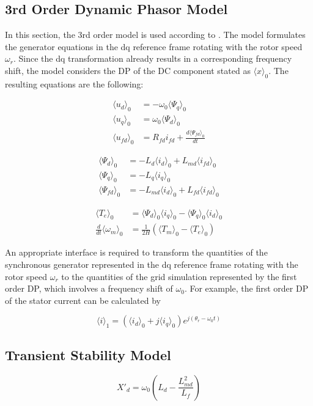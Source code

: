 \subsection{3rd Order Dynamic Phasor Model}

In this section, the 3rd order model is used according to \cite{eremia_2013}.
The model formulates the generator equations in the dq reference frame rotating with the rotor speed $\omega_{r}$.
Since the dq transformation already results in a corresponding frequency shift, the model considers the DP of the DC component stated as $\langle x \rangle _{0}$.
The resulting equations are the following:

\begin{align}
  \langle u_{d} \rangle _{0} &= - \omega_{0} \langle \Psi_{q} \rangle _{0} \\
  \langle u_{q} \rangle _{0} &= \omega_{0} \langle \Psi_{d} \rangle _{0} \\
  \langle u_{fd} \rangle _{0} &= R_{fd} i_{fd} + \frac{d\langle \Psi_{fd} \rangle _{0}}{dt}
\end{align}

\begin{align}
  \langle \Psi_{d} \rangle _{0} &= - L_{d} \langle i_{d} \rangle _{0} + L_{md} \langle i_{fd} \rangle _{0} \\
  \langle \Psi_{q} \rangle _{0} &= - L_{q} \langle i_{q} \rangle _{0} \\
  \langle \Psi_{fd} \rangle _{0} &= - L_{md} \langle i_{d} \rangle _{0} + L_{fd} \langle i_{fd} \rangle _{0}
\end{align}

\begin{align}
  \langle T_{e} \rangle _{0} &= \langle \Psi_{d} \rangle _{0} \langle i_{q} \rangle _{0} - \langle \Psi_{q} \rangle _{0} \langle i_{d} \rangle _{0} \\
  \frac{d}{dt}\langle \omega_{m} \rangle _{0} &= \frac{1}{2H}(\langle T_{m} \rangle _{0} - \langle T_{e} \rangle _{0})
\end{align}

An appropriate interface is required to transform the quantities of the synchronous generator represented in the dq reference frame rotating with the rotor speed $\omega_{r}$ to the quantities of the grid simulation represented by the first order DP, which involves a frequency shift of $\omega_{0}$.
For example, the first order DP of the stator current can be calculated by

\begin{equation}
  \langle i \rangle _{1} = (\langle i_{d} \rangle _{0} + j \langle i_{q} \rangle _{0})e^{j(\theta_{r}-\omega_{0}t)}
\end{equation}

\subsection{Transient Stability Model}
\begin{equation}
  X'_{d} = \omega_{0} \left( L_d - \frac{L^2_{md}}{L_f} \right)
\end{equation}



